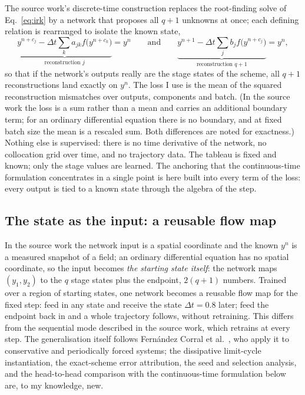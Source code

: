 \documentclass[11pt,a4paper]{article}
\begin{document}
The source work's discrete-time construction replaces the root-finding
solve of Eq.~\eqref{eq:irk} by a network that proposes all $q+1$ unknowns
at once; each defining relation is rearranged to isolate the known state,
\begin{equation}
  \underbrace{y^{n+c_j} - \Delta t \sum_k a_{jk} f\big(y^{n+c_k}\big)}_{\text{reconstruction } j} = y^n
  \qquad\text{and}\qquad
  \underbrace{y^{n+1} - \Delta t \sum_j b_j f\big(y^{n+c_j}\big)}_{\text{reconstruction } q+1} = y^n ,
  \label{eq:recon}
\end{equation}
so that if the network's outputs really are the stage states of the scheme,
all $q+1$ reconstructions land exactly on $y^n$. The loss I use is the
mean of the squared reconstruction mismatches over outputs, components and
batch.
(In the source work the loss is a sum rather than a mean and carries an
additional boundary term; for an ordinary differential equation there is no
boundary, and at fixed batch size the mean is a rescaled sum. Both
differences are noted for exactness.) Nothing else is supervised: there is
no time derivative of the network, no collocation grid over time, and no
trajectory data. The tableau is fixed and known; only the stage values are
learned. The anchoring that the continuous-time formulation concentrates
in a single point is here built into every term of the loss: every output
is tied to a known state through the algebra of the step.

\subsection{The state as the input: a reusable flow map}

In the source work the network input is a spatial coordinate and the known
$y^n$ is a measured snapshot of a field; an ordinary differential equation
has no spatial coordinate, so the input becomes \emph{the starting state
itself}: the network maps $(y_1, y_2)$ to the $q$ stage states plus the
endpoint, $2(q+1)$ numbers. Trained over a region of starting states, one
network becomes a reusable flow map for the fixed step: feed in any state
and receive the state $\Delta t = 0.8$ later; feed the endpoint back in
and a whole trajectory follows, without retraining. This differs from the
sequential mode described in the source work, which retrains at every step.
The generalisation itself follows Fern\'andez Corral et
al.~\cite{fernandez2024}, who apply it to conservative and periodically
forced systems; the dissipative limit-cycle instantiation, the
exact-scheme error attribution, the seed and selection analysis, and the
head-to-head comparison with the continuous-time formulation below are, to
my knowledge, new.
\end{document}

